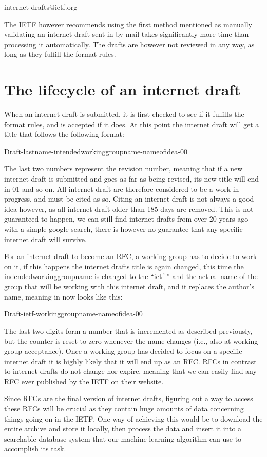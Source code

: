 \documentclass{report}
\begin{document}
internet-drafts@ietf.org

The IETF however recommends using the first method mentioned as manually validating an  internet draft sent in by mail takes significantly more time than processing it automatically. The drafts are however not reviewed in any way, as long as they fulfill the format rules.

\section{The lifecycle of an internet draft}
When an internet draft is submitted, it is first checked to see if it fulfills the format rules, and is accepted if  it does. At this point the internet draft will get a title that follows the following format:

Draft-lastname-intendedworkinggroupname-nameofidea-00

The last two numbers represent the revision number, meaning that if a new internet draft is submitted and goes as far as being revised, its new title will end in 01 and so on. All internet draft are therefore considered to be a work in progress, and must be cited as so. Citing an internet draft is not always a good idea however, as all internet draft older than 185 days are removed. This is not guaranteed to  happen, we can still find internet drafts from over 20 years ago with a simple google search, there is however no guarantee that any specific internet draft will survive.

For an internet draft to become an RFC, a working group has to decide to work on it, if this happens the internet drafts title is again changed, this time the indendedworkinggroupname is changed to the “ietf-” and the actual name of the group that will be working with this internet draft, and it replaces the author’s name, meaning in now looks like this: 
	
 	Draft-ietf-workinggroupname-nameofidea-00

The last two digits form a number that is incremented as described previously, but the counter is reset to zero whenever the name changes (i.e., also at working group acceptance). Once a working group has decided to focus on a specific internet draft it is highly likely that it will end up as an RFC. RFCs in contrast to internet drafts do not change nor expire, meaning that we can easily find any RFC ever published by the IETF on their website.

Since RFCs are the final version of internet drafts, figuring out a way to access these RFCs will be crucial as they contain huge amounts of data concerning things going on in the IETF. One way of achieving this would be to download the entire archive and store it locally, then process the data and insert it into a searchable database system that our machine learning algorithm can use to accomplish its task.
\end{document}
